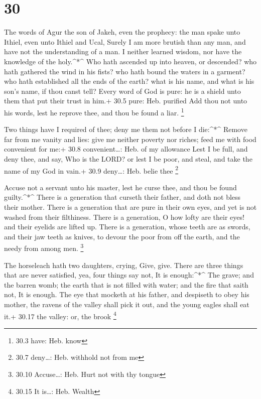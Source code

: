 \hypertarget{section-29}{%
\section{30}\label{section-29}}

 The words of Agur the son of Jakeh, even the prophecy: the
man spake unto Ithiel, even unto Ithiel and Ucal,  Surely I
am more brutish than any man, and have not the understanding of a man.
 I neither learned wisdom, nor have the knowledge of the
holy.\^{}*\^{}  Who hath ascended up into heaven, or
descended? who hath gathered the wind in his fists? who hath bound the
waters in a garment? who hath established all the ends of the earth?
what is his name, and what is his son's name, if thou canst tell?
 Every word of God is pure: he is a shield unto them that
put their trust in him.+ 30.5 pure: Heb. purified  Add thou
not unto his words, lest he reprove thee, and thou be found a liar.
\footnote{30.3 have: Heb. know}

 Two things have I required of thee; deny me them not before
I die:\^{}*\^{}  Remove far from me vanity and lies: give me
neither poverty nor riches; feed me with food convenient for me:+ 30.8
convenient\ldots: Heb. of my allowance  Lest I be full, and
deny thee, and say, Who is the LORD? or lest I be poor, and steal, and
take the name of my God in vain.+ 30.9 deny\ldots: Heb. belie thee
\footnote{30.7 deny\ldots: Heb. withhold not from me}

 Accuse not a servant unto his master, lest he curse thee,
and thou be found guilty.\^{}*\^{}  There is a generation
that curseth their father, and doth not bless their mother.
 There is a generation that are pure in their own eyes, and
yet is not washed from their filthiness.  There is a
generation, O how lofty are their eyes! and their eyelids are lifted up.
 There is a generation, whose teeth are as swords, and
their jaw teeth as knives, to devour the poor from off the earth, and
the needy from among men. \footnote{30.10 Accuse\ldots: Heb. Hurt not
  with thy tongue}

 The horseleach hath two daughters, crying, Give, give.
There are three things that are never satisfied, yea, four things say
not, It is enough:\^{}*\^{}  The grave; and the barren
womb; the earth that is not filled with water; and the fire that saith
not, It is enough.  The eye that mocketh at his father, and
despiseth to obey his mother, the ravens of the valley shall pick it
out, and the young eagles shall eat it.+ 30.17 the valley: or, the brook
\footnote{30.15 It is\ldots: Heb. Wealth}

